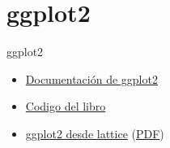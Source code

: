 \documentclass[xcolor={usenames,svgnames,dvipsnames}]{beamer}
\begin{document}
\section{ggplot2}
\label{sec-4}
\begin{frame}[label=sec-4-1]{ggplot2}
\begin{itemize}
\item \href{http://docs.ggplot2.org/current/}{Documentación de ggplot2}
\item \href{http://ggplot2.org/book/}{Codigo del libro}
\item \href{http://learnr.wordpress.com/2009/06/28/ggplot2-version-of-figures-in-lattice-multivariate-data-visualization-with-r-part-1/}{ggplot2 desde lattice} (\href{http://learnr.files.wordpress.com/2009/08/latbook.pdf}{PDF})
\end{itemize}
\end{frame}
\end{document}
